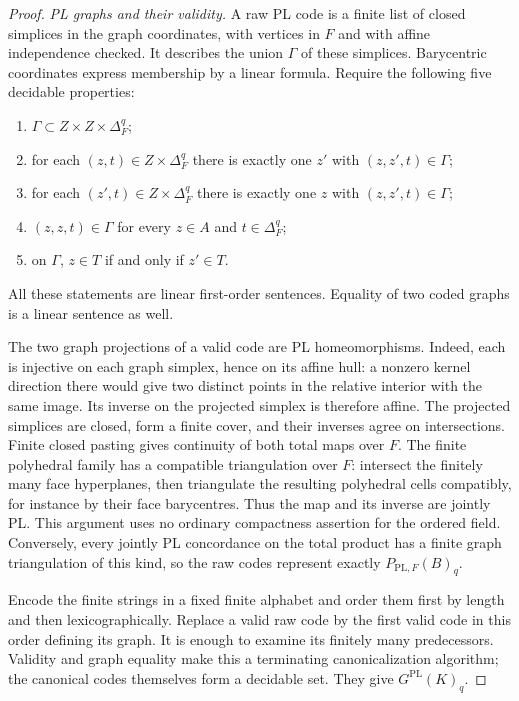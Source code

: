 \begin{proof}
\medskip\noindent\textit{PL graphs and their validity.}
A raw PL code is a finite list of closed simplices in the graph
coordinates, with vertices in $F$ and with affine independence
checked.  It describes the union $\Gamma$ of these simplices.
Barycentric coordinates express membership by a linear formula.
Require the following five decidable properties:
\begin{enumerate}
\item $\Gamma\subset Z\times Z\times\Delta^q_F$;
\item for each $(z,t)\in Z\times\Delta^q_F$ there is exactly one
      $z'$ with $(z,z',t)\in\Gamma$;
\item for each $(z',t)\in Z\times\Delta^q_F$ there is exactly one
      $z$ with $(z,z',t)\in\Gamma$;
\item $(z,z,t)\in\Gamma$ for every $z\in A$ and $t\in\Delta^q_F$;
\item on $\Gamma$, $z\in T$ if and only if $z'\in T$.
\end{enumerate}
All these statements are linear first-order sentences.  Equality
of two coded graphs is a linear sentence as well.

The two graph projections of a valid code are PL homeomorphisms.
Indeed, each is injective on each graph simplex, hence on its affine
hull: a nonzero kernel direction there would give two distinct points
in the relative interior with the same image.  Its inverse on the
projected simplex is therefore affine.  The projected simplices are
closed, form a finite cover, and their inverses agree on intersections.
Finite closed pasting gives continuity of both total maps over $F$.
The finite polyhedral family has a compatible triangulation over $F$:
intersect the finitely many face hyperplanes, then triangulate the
resulting polyhedral cells compatibly, for instance by their face
barycentres.  Thus the map and its inverse are jointly PL.  This
argument uses no ordinary compactness assertion for the ordered field.
Conversely, every jointly PL concordance on the total product has a
finite graph triangulation of this kind, so the raw codes represent
exactly $P_{\mathrm{PL},F}(B)_q$.

Encode the finite strings in a fixed finite alphabet and order them
first by length and then lexicographically.  Replace a valid raw code
by the first valid code in this order defining its graph.  It is
enough to examine its finitely many predecessors.  Validity and
graph equality make this a terminating canonicalization algorithm;
the canonical codes themselves form a decidable set.  They give
$G^{\mathrm{PL}}(K)_q$.


\end{proof}
